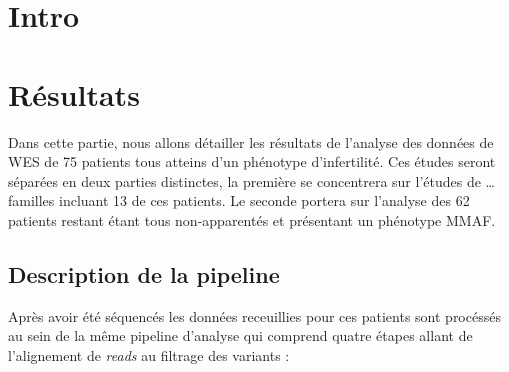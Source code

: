 \documentclass[12pt,twoside]{reedthesis}
\theoremstyle{definition}
\theoremstyle{definition}
\theoremstyle{remark}
\begin{document}
  \section{Intro}\label{intro}
  
  \newpage
  
  \section{Résultats}\label{resultats}
  
  Dans cette partie, nous allons détailler les résultats de l'analyse des
  données de WES de 75 patients tous atteins d'un phénotype d'infertilité.
  Ces études seront séparées en deux parties distinctes, la première se
  concentrera sur l'études de \ldots{} familles incluant 13 de ces
  patients. Le seconde portera sur l'analyse des 62 patients restant étant
  tous non-apparentés et présentant un phénotype MMAF.
  
  \subsection{Description de la
  pipeline}\label{description-de-la-pipeline}
  
  Après avoir été séquencés les données receuillies pour ces patients sont
  procéssés au sein de la même pipeline d'analyse qui comprend quatre
  étapes allant de l'alignement de \emph{reads} au filtrage des variants :
  
\end{document}
